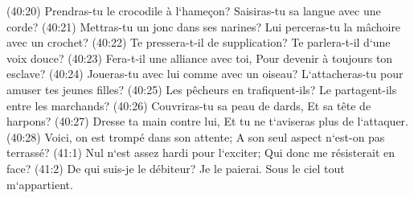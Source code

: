 \verse (40:20) Prendras-tu le crocodile à l`hameçon? Saisiras-tu sa langue avec une corde? 
\verse (40:21) Mettras-tu un jonc dans ses narines? Lui perceras-tu la mâchoire avec un crochet? 
\verse (40:22) Te pressera-t-il de supplication? Te parlera-t-il d`une voix douce? 
\verse (40:23) Fera-t-il une alliance avec toi, Pour devenir à toujours ton esclave? 
\verse (40:24) Joueras-tu avec lui comme avec un oiseau? L`attacheras-tu pour amuser tes jeunes filles? 
\verse (40:25) Les pêcheurs en trafiquent-ils? Le partagent-ils entre les marchands? 
\verse (40:26) Couvriras-tu sa peau de dards, Et sa tête de harpons? 
\verse (40:27) Dresse ta main contre lui, Et tu ne t`aviseras plus de l`attaquer. 
\verse (40:28) Voici, on est trompé dans son attente; A son seul aspect n`est-on pas terrassé? 
\verse (41:1) Nul n`est assez hardi pour l`exciter; Qui donc me résisterait en face? 
\verse (41:2) De qui suis-je le débiteur? Je le paierai. Sous le ciel tout m`appartient. 
